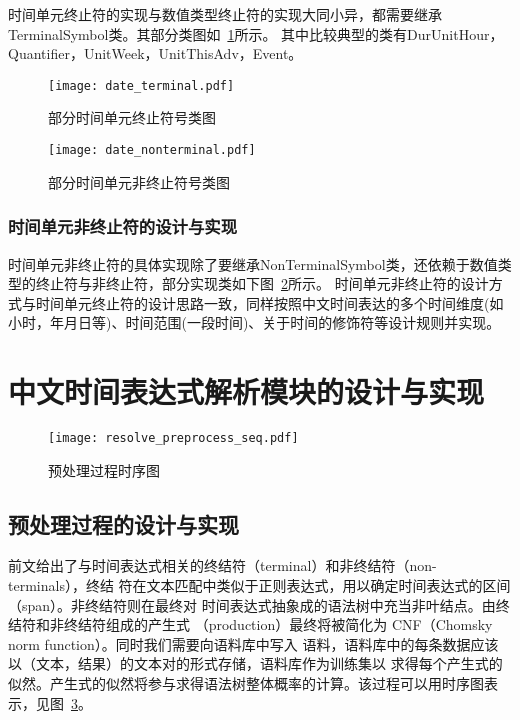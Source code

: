 时间单元终止符的实现与数值类型终止符的实现大同小异，都需要继承TerminalSymbol类。其部分类图如~\ref{fig:date_terminal}所示。
其中比较典型的类有DurUnitHour，Quantifier，UnitWeek，UnitThisAdv，Event。

\begin{figure}[h]
    \centering
    \texttt{[image: date\_terminal.pdf]}
    \caption{部分时间单元终止符号类图}
    \label{fig:date_terminal}
\end{figure}

\begin{figure}[h]
    \centering
    \texttt{[image: date\_nonterminal.pdf]}
    \caption{部分时间单元非终止符号类图}
    \label{fig:date_nonterminal}
\end{figure}

\subsubsection{时间单元非终止符的设计与实现}

时间单元非终止符的具体实现除了要继承NonTerminalSymbol类，还依赖于数值类型的终止符与非终止符，部分实现类如下图~\ref{fig:date_nonterminal}所示。
时间单元非终止符的设计方式与时间单元终止符的设计思路一致，同样按照中文时间表达的多个时间维度(如小时，年月日等)、时间范围(一段时间)、关于时间的修饰符等设计规则并实现。

\section{中文时间表达式解析模块的设计与实现}

\begin{figure}[h]
    \centering
    \texttt{[image: resolve\_preprocess\_seq.pdf]}
    \caption{预处理过程时序图}
    \label{fig:resolve_preprocess_seq}
\end{figure}

\subsection{预处理过程的设计与实现}

前文给出了与时间表达式相关的终结符（terminal）和非终结符（non-terminals），终结
符在文本匹配中类似于正则表达式，用以确定时间表达式的区间（span）。非终结符则在最终对
时间表达式抽象成的语法树中充当非叶结点。由终结符和非终结符组成的产生式
（production）最终将被简化为 CNF（Chomsky norm function）。同时我们需要向语料库中写入
语料，语料库中的每条数据应该以（文本，结果）的文本对的形式存储，语料库作为训练集以
求得每个产生式的似然。产生式的似然将参与求得语法树整体概率的计算。该过程可以用时序图表示，见图~\ref{fig:resolve_preprocess_seq}。



